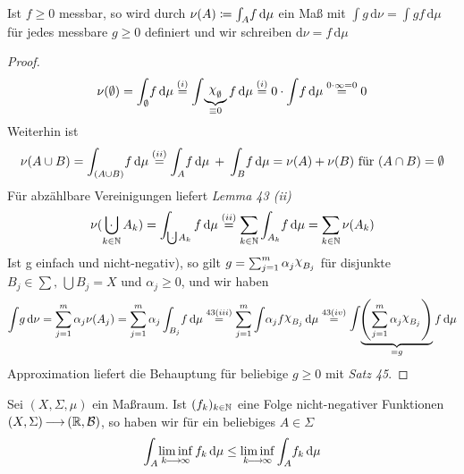 \documentclass[skript.tex]{subfiles}
\begin{document}
	\begin{lem}
		Ist $f\geq 0$ messbar, so wird durch $\nu(A)\coloneqq\int_A \! f \, \mathrm{d}\mu$ ein Maß mit $\int \! g \, \mathrm{d}\nu=\int \! g f \, \mathrm{d}\mu$ für jedes messbare $g\geq 0$ definiert und wir schreiben $\mathrm{d}\nu=f\, \mathrm{d}\mu$
	\end{lem}
	\begin{proof}
		\begin{equation*}
			\nu(\emptyset)=\int_{\emptyset} \! f \, \mathrm{d}\mu \stackrel{(i)}=\int \! \underbrace{\rchi_\emptyset}_{\equiv 0}f \, \mathrm{d}\mu \stackrel{(i)}=0\cdot \int \! f \, \mathrm{d}\mu \stackrel{0\cdot\infty=0}=0
		\end{equation*}
		Weiterhin ist
		\begin{equation*}
			\nu(A\cup B)=\int_{(A\cup B)} \! f \, \mathrm{d}\mu \stackrel{(ii)}=\int_A \! f \, \mathrm{d}\mu \: + \: \int_B \! f \, \mathrm{d}\mu = \nu(A)+\nu(B)$ für $(A\cap B) = \es
		\end{equation*}
		Für abzählbare Vereinigungen liefert \textit{Lemma 43 (ii)}
		\begin{equation*}
			\nu(\bigcupdot_{k\in\N}A_k)=\int_{\bigcupdot A_k} f \, \mathrm{d}\mu \stackrel{(ii)}= \sum_{k\in\N}\int_{A_k} \! f \, \mathrm{d}\mu=\sum_{k\in\N} \nu(A_k)
		\end{equation*}
		Ist g einfach und nicht-negativ), so gilt $g=\sum_{j=1}^{m} \alpha_j \rchi_{B_j}$ für disjunkte $B_j\in\sum, \, \bigcup B_j=X$ und $\alpha_j\geq 0$, und wir haben
		\begin{equation*}
		\int \! g \, \mathrm{d}\nu= \sum_{j=1}^{m} \alpha_j \nu(A_j)=\sum_{j=1}^{m} \alpha_j \int_{B_j} \! f \, \mathrm{d}\mu \stackrel{43(iii)}= \sum_{j=1}^{m}\int \! \alpha_j f \rchi_{B_j} \, \mathrm{d}\mu \stackrel{43(iv)}= \mathlarger{\mathlarger{\int}} \! \underbrace{\pr{\sum_{j=1}^{m}\alpha_j \rchi_{B_j}}}_{=g}f \, \mathrm{d}\mu
		\end{equation*}
		Approximation liefert die Behauptung für beliebige $g\geq0$ mit \textit{Satz 45}.
		\end{proof}

		\begin{theorem}
			Sei $(X,\Sigma,\mu)$ ein Maßraum. Ist $(f_k)_{k\in\mathbb{N}}$ eine Folge nicht-negativer Funktionen $(X,\Sigma) \kern -1pt \longrightarrow \kern -1pt (\mathbb{R}, \mathcal{B})$, so haben wir für ein beliebiges $A\in\Sigma$
			\begin{equation*}
				\int_A \! \liminf_{k\kern -1pt \longrightarrow \kern -1pt\infty} f_k \, \mathrm{d}\mu \leq \liminf_{k\kern -1pt \longrightarrow \kern -1pt\infty}\int_A \! f_k \, \mathrm{d}\mu
			\end{equation*}
		\end{theorem}
\end{document}
